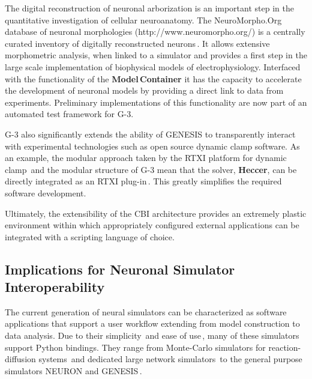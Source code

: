 \documentclass[10pt]{article}
\begin{document}
The digital reconstruction of neuronal arborization is an important step in the
quantitative investigation of cellular neuroanatomy.  The NeuroMorpho.Org database of neuronal morphologies
(http://www.neuromorpho.org/) is a centrally curated inventory of
digitally reconstructed neurons\,\cite{ascoli06:_mobil}.  It allows
extensive morphometric analysis, when linked to a simulator and provides a first step in the large scale
implementation of biophysical models of electrophysiology.  Interfaced with the functionality of the {\bf Model\,Container} it has the capacity to
accelerate the development of neuronal models by providing a direct
link to data from experiments.  Preliminary implementations of this
functionality are now part of an automated test framework for G-3.

G-3 also significantly extends the ability of GENESIS to transparently
interact with experimental technologies such as open source dynamic
clamp software.  As an example, the modular approach taken by the RTXI
platform for dynamic
clamp\,\cite{bettencourt08:_effec_imper_dynam_clamp, dorval01:_real}
and the modular structure of G-3 mean that the solver, {\bf Heccer},
can be directly integrated as an RTXI
plug-in\,\cite{cornelis10:_realt_rtxi_genes}.  This greatly simplifies
the required software development.

Ultimately, the extensibility of the CBI 
architecture provides an extremely plastic environment within which
appropriately configured external applications can be integrated with a scripting language of
choice.

\subsection*{Implications for Neuronal Simulator Interoperability}

The current generation of neural simulators can be characterized as
software applications that support a user workflow extending from
model construction to data analysis.  Due to their simplicity\,\cite{goodman08:_brian} and ease of use\,\cite{pecevski09:_pcsim}, many of these simulators support Python bindings. 
They range from Monte-Carlo
simulators for reaction-diffusion systems\,\cite{wils09:_steps} and
dedicated large network simulators\,\cite{eppler08:_pynes} to the
general purpose simulators NEURON and GENESIS\,\cite{hines09:_neuron_python, bower98:_book_genes}.
\end{document}
